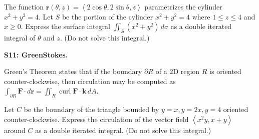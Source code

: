 \documentclass[12pt]{article}
\newcommand{\vect}{\mathbf}
\newcommand{\<}{\left\langle}
\renewcommand{\>}{\right\rangle}
\newcommand{\curl}{\operatorname{curl}}
\newcommand{\dv}{\operatorname{div}}
\newcommand{\exerciseHeader}[4]{


  \vspace{0.5em}
  \textbf{#2}
  \vspace{0.5em}

}
\begin{document}
\begin{multicols}{2}
The function \(\vect{r}(\theta,z)=\<2\cos\theta,2\sin\theta,z\>\) parametrizes
the cylinder \(x^2+y^2=4\). Let \(S\) be the portion of the cylinder
\(x^2+y^2=4\) where \(1\leq z\leq 4\) and \(x\geq 0\).
Express the surface integral
\(\iint_S (x^2+y^2)\,d\sigma\) as a double iterated integral
of \(\theta\) and \(z\). (Do not solve this integral.)

%



%
%

\exerciseHeader{2017 July 25}{S11: GreenStokes.}{
Apply Green's Theorem and Stokes's Theorem.
}{}

Green's Theorem states that if the boundary \(\partial R\) of a
2D region \(R\) is oriented counter-clockwise,
then circulation may be computed as \(\int_{\partial R}\vect F\cdot d\vect{r}=
\iint_R\curl\vect F\cdot\vect{k}\,dA\).

Let \(C\) be the boundary of the triangle bounded by \(y=x,y=2x,y=4\)
oriented counter-clockwise. Express the circulation of the vector field
\(\<x^2y,x+y\>\) around \(C\) as a double iterated integral.
(Do not solve this integral.)

\columnbreak



%
%


\end{multicols}
\end{document}
